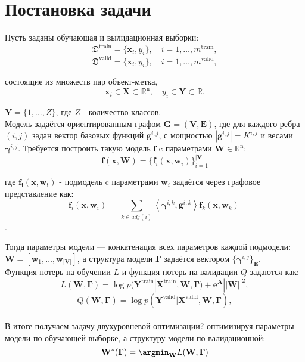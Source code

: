 \documentclass[12pt,twoside]{article}
\begin{document}
\section{ Постановка задачи}
Пусть заданы обучающая и вылидационная выборки:
\[
\mathfrak{D}^{\text{train}} = \{\mathbf{x}_i, y_i\}, \quad i=1,\dots,m^{\text{train}},
\]
\[
\mathfrak{D}^{\text{valid}} = \{\mathbf{x}_i, y_i\}, \quad i=1,\dots,m^{\text{valid}},
\]

состоящие из множеств пар объект-метка,
\[
\mathbf{x}_i\in\mathbf{X}\subset\mathbb{R}^{\text{n}},\quad y_i\in\mathbf{Y}\subset\mathbb{R}.
\] 

$\mathbf{Y}= \{1,\dots,Z\}$, где $Z$ - количество классов.
\\

Модель задаётся ориентированным графом $\mathbf{G=(V,E)}$, где для каждого ребра $(i,j)$ задан вектор базовых функций $\mathbf{g}^{i,j}$, с мощностью $|\mathbf{g}^{i,j}| = K^{i,j}$ и весами $\boldsymbol{\gamma}^{i,j}$. Требуется построить такую модель $\mathbf{f}$ c параметрами $\mathbf{W}\in\mathbb{R}^\text{n}$:
\[
\mathbf{f}(\mathbf{x}, \mathbf{W})= \{ \mathbf{f}_i(\mathbf{x}, \mathbf{w}_i)\}_{i=1}^\mathbf{|V|}
\]

где $\mathbf{f_i(x, w_i)}$ - подмодель c параметрами $\mathbf{w}_i$ задаётся через графовое представление как:
\[
\mathbf{f}_i(\mathbf{x}, \mathbf{w}_i)\ = \sum_{k\in adj(i)} \left\langle {\boldsymbol{\gamma}^{i,k}, \mathbf{g}^{i,k}} \right\rangle \mathbf{f}_k(\mathbf{x}, \mathbf{w}_k)\
\].

Тогда параметры модели --- конкатенация всех параметров каждой подмодели: $\mathbf{W}=[\mathbf{w}_1,\dots,\mathbf{w}_\mathbf{|V|}]$, а структура модели $\boldsymbol{\Gamma}$ задаётся вектором $\{ \boldsymbol{\gamma}^{i,j}\}_\mathbf{E}$.
\\

Функция потерь на обучении $L$ и функция потерь на валидации $Q$ задаются как:
\[
L (\mathbf{W}, \boldsymbol{\Gamma})= \log p(\mathbf{Y}^\text{train}|\mathbf{X}^\text{train}, \mathbf{W}, \boldsymbol{\Gamma}) + \boldsymbol{e}^{\mathbf{A}}||\mathbf{W}||^2,
\]
\[
Q (\mathbf{W}, \boldsymbol{\Gamma})= \log p(\mathbf{Y}^\text{valid}|\mathbf{X}^\text{valid}, \mathbf{W}, \boldsymbol{\Gamma}),
\]
\\
В итоге получаем задачу двухуровневой оптимизации? оптимизируя параметры модели по обучающей выборке, а структуру модели по валидационной: 
\[
\mathbf{W}^*( \boldsymbol{\Gamma}) = \argmin_{\mathbf{W}}
L (\mathbf{W}, \boldsymbol{\Gamma})\]
\end{document}
